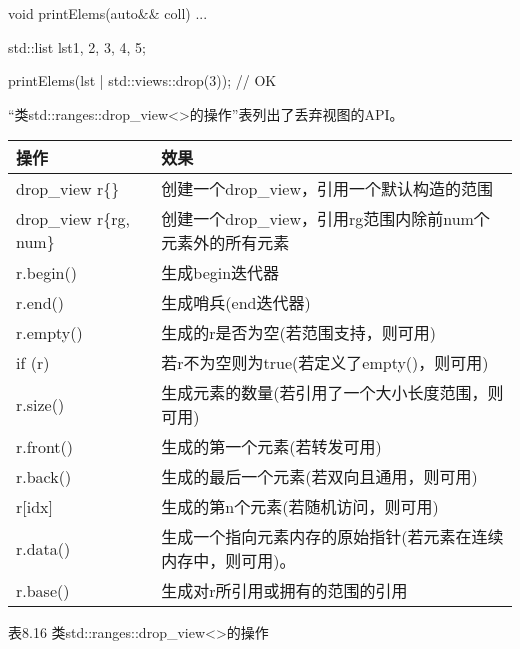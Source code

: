 \begin{cpp}
void printElems(auto&& coll) {
	...
}

std::list lst{1, 2, 3, 4, 5};

printElems(lst | std::views::drop(3)); // OK
\end{cpp}


“类std::ranges::drop\_view<>的操作”表列出了丢弃视图的API。

\begin{longtable}[c]{|l|l|}
\hline
\textbf{操作} & \textbf{效果}                                                        \\ \hline
\endfirsthead
%
\endhead
%
drop\_view r\{\}   & 创建一个drop\_view，引用一个默认构造的范围        \\ \hline
drop\_view r\{rg, num\} & 创建一个drop\_view，引用rg范围内除前num个元素外的所有元素                      \\ \hline
r.begin()          & 生成begin迭代器                                              \\ \hline
r.end()            & 生成哨兵(end迭代器)                                     \\ \hline
r.empty()          & 生成的r是否为空(若范围支持，则可用)         \\ \hline
if (r)             & 若r不为空则为true(若定义了empty()，则可用)                \\ \hline
r.size()           & 生成元素的数量(若引用了一个大小长度范围，则可用) \\ \hline
r.front()          & 生成的第一个元素(若转发可用)                      \\ \hline
r.back()           & 生成的最后一个元素(若双向且通用，则可用)         \\ \hline
r{[}idx{]}         & 生成的第n个元素(若随机访问，则可用)                    \\ \hline
r.data()           & 生成一个指向元素内存的原始指针(若元素在连续内存中，则可用)。 \\ \hline
r.base()           & 生成对r所引用或拥有的范围的引用               \\ \hline
\end{longtable}

\begin{center}
表8.16 类std::ranges::drop\_view<>的操作
\end{center}

